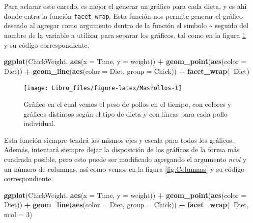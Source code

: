 \documentclass[]{book}
\newenvironment{Shaded}{\begin{snugshade}}{\end{snugshade}}
\newcommand{\DataTypeTok}[1]{\textcolor[rgb]{0.13,0.29,0.53}{#1}}
\newcommand{\DecValTok}[1]{\textcolor[rgb]{0.00,0.00,0.81}{#1}}
\newcommand{\KeywordTok}[1]{\textcolor[rgb]{0.13,0.29,0.53}{\textbf{#1}}}
\newcommand{\NormalTok}[1]{#1}
\newcommand{\OperatorTok}[1]{\textcolor[rgb]{0.81,0.36,0.00}{\textbf{#1}}}
\newcommand{\StringTok}[1]{\textcolor[rgb]{0.31,0.60,0.02}{#1}}
\begin{document}
Para aclarar este enredo, es mejor el generar un gráfico para cada
dieta, y es ahí donde entra la función \texttt{facet\_wrap}. Esta
función nos permite generar el gráfico deseado al agregar como argumento
dentro de la función el simbolo \texttt{\textasciitilde{}} seguido del
nombre de la variable a utilizar para separar los gráficos, tal como en
la figura \ref{fig:MasPollos} y su código correspondiente.

\begin{Shaded}
\begin{Highlighting}[]
\KeywordTok{ggplot}\NormalTok{(ChickWeight, }\KeywordTok{aes}\NormalTok{(}\DataTypeTok{x =}\NormalTok{ Time, }\DataTypeTok{y =}\NormalTok{ weight)) }\OperatorTok{+}\StringTok{ }\KeywordTok{geom_point}\NormalTok{(}\KeywordTok{aes}\NormalTok{(}\DataTypeTok{color =}\NormalTok{ Diet)) }\OperatorTok{+}\StringTok{ }
\StringTok{    }\KeywordTok{geom_line}\NormalTok{(}\KeywordTok{aes}\NormalTok{(}\DataTypeTok{color =}\NormalTok{ Diet, }\DataTypeTok{group =}\NormalTok{ Chick)) }\OperatorTok{+}\StringTok{ }\KeywordTok{facet_wrap}\NormalTok{(}\OperatorTok{~}\NormalTok{Diet)}
\end{Highlighting}
\end{Shaded}

\begin{figure}

{\centering \texttt{[image: Libro\_files/figure-latex/MasPollos-1]} 

}

\caption{Gráfico en el cual vemos el peso de pollos en el tiempo, con colores y gráficos distintos según el tipo de dieta y con líneas para cada pollo individual.}\label{fig:MasPollos}
\end{figure}

Esta función siempre tendrá los mismos ejes y escala para todos los
gráficos. Además, intentará siempre dejar la disposición de los gráficos
de la forma más cuadrada posible, pero esto puede ser modificado
agregando el argumento \emph{ncol} y un número de columnas, así como
vemos en la figura \ref{fig:Columnas} y su código correspondiente.

\begin{Shaded}
\begin{Highlighting}[]
\KeywordTok{ggplot}\NormalTok{(ChickWeight, }\KeywordTok{aes}\NormalTok{(}\DataTypeTok{x =}\NormalTok{ Time, }\DataTypeTok{y =}\NormalTok{ weight)) }\OperatorTok{+}\StringTok{ }\KeywordTok{geom_point}\NormalTok{(}\KeywordTok{aes}\NormalTok{(}\DataTypeTok{color =}\NormalTok{ Diet)) }\OperatorTok{+}\StringTok{ }
\StringTok{    }\KeywordTok{geom_line}\NormalTok{(}\KeywordTok{aes}\NormalTok{(}\DataTypeTok{color =}\NormalTok{ Diet, }\DataTypeTok{group =}\NormalTok{ Chick)) }\OperatorTok{+}\StringTok{ }\KeywordTok{facet_wrap}\NormalTok{(}\OperatorTok{~}\NormalTok{Diet, }
    \DataTypeTok{ncol =} \DecValTok{3}\NormalTok{)}
\end{Highlighting}
\end{Shaded}
\end{document}
